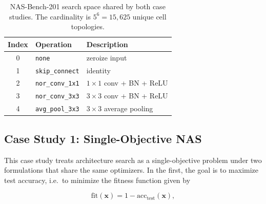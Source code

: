 \documentclass[runningheads]{llncs}
\begin{document}
\begin{table}[t]
\centering
\caption{NAS-Bench-201 search space shared by both case studies. The cardinality is $5^6 = 15{,}625$ unique cell topologies.}
\label{tab:space}
\begin{tabular}{cll}
\toprule
\textbf{Index} & \hspace{5mm} \textbf{Operation} & \hspace{5mm}  \textbf{Description} \\
\midrule
0 & \hspace{5mm} \texttt{none}           & \hspace{5mm}  zeroize input \\
1 & \hspace{5mm} \texttt{skip\_connect}  & \hspace{5mm}  identity \\
2 & \hspace{5mm} \texttt{nor\_conv\_1x1} & \hspace{5mm}  $1\times1$ conv + BN + ReLU \\
3 & \hspace{5mm} \texttt{nor\_conv\_3x3} & \hspace{5mm}  $3\times3$ conv + BN + ReLU \\
4 & \hspace{5mm} \texttt{avg\_pool\_3x3} & \hspace{5mm}  $3\times3$ average pooling \\
\bottomrule
\end{tabular}
\end{table}

%
%
\subsection{Case Study 1: Single-Objective NAS} \label{SEC3.2}
This case study treats architecture search as a single-objective problem under two formulations that share the same optimizers. In the first, the goal is to maximize test accuracy, i.e.\ to minimize the fitness function 
given by
  
\begin{equation}
\mathrm{fit}(\mathbf{x}) = 1 - \mathrm{acc}_{\mathrm{test}}(\mathbf{x}),
\label{eq:fit}
\end{equation}
\end{document}
